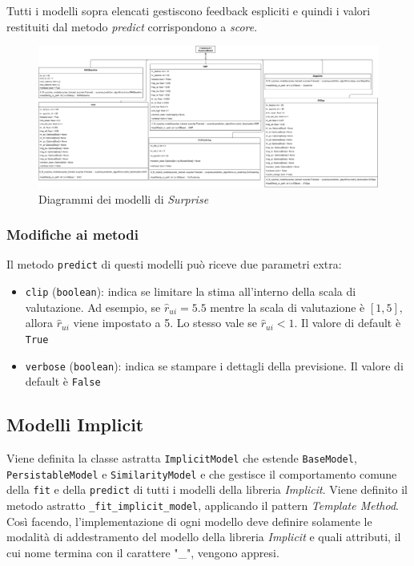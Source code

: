 Tutti i modelli sopra elencati gestiscono feedback espliciti e quindi i valori restituiti dal metodo \textit{predict} corrispondono a \textit{score}.


\begin{figure}[H]
    \centering
    \includegraphics[angle=90, scale=0.09]{figures/UML/models/surprise_models.png}
    \caption{Diagrammi dei modelli di \textit{Surprise}}
\end{figure}

\subsubsection{Modifiche ai metodi}

Il metodo \texttt{predict} di questi modelli può riceve due parametri extra:

\begin{itemize}
    \item \texttt{clip} (\texttt{boolean}): indica se limitare la stima all'interno della scala di valutazione. Ad esempio, se $\hat{r}_{ui} = 5.5$ mentre la scala di valutazione è $[1, 5],$ allora $\hat{r}_{ui}$ viene impostato a 5. Lo stesso vale se $\hat{r}_{ui} < 1.$ Il valore di default è \texttt{True}
    \item \texttt{verbose} (\texttt{boolean}): indica se stampare i dettagli della previsione. Il valore di default è \texttt{False}
\end{itemize}

\subsection{Modelli Implicit}

Viene definita la classe astratta \texttt{ImplicitModel} che estende \texttt{BaseModel},\\ \texttt{PersistableModel} e \texttt{SimilarityModel} e che gestisce il comportamento comune della \texttt{fit} e della \texttt{predict} di tutti i modelli della libreria \textit{Implicit}. Viene definito il metodo astratto \texttt{\_fit\_implicit\_model}, applicando il pattern \textit{Template Method}. Così facendo, l'implementazione di ogni modello deve definire solamente le modalità di addestramento del modello della libreria \textit{Implicit} e quali attributi, il cui nome termina con il carattere "\_", vengono appresi.

